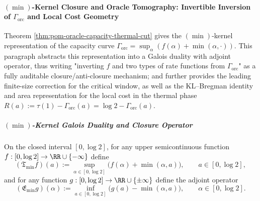 \paragraph{\texorpdfstring{$(\min)$}{min}-Kernel Closure and Oracle Tomography: Invertible Inversion of \texorpdfstring{$\Gamma_{\mathrm{orc}}$}{Gamma\_orc} and Local Cost Geometry}
Theorem \ref{thm:pom-oracle-capacity-thermal-cut} gives the \((\min)\)-kernel representation of the capacity curve
\(
\Gamma_{\mathrm{orc}}=\sup_{\alpha}(f(\alpha)+\min(\alpha,\cdot))
\).
This paragraph abstracts this representation into a Galois duality with adjoint operator, thus writing "inverting \(f\) and two types of rate functions from \(\Gamma_{\mathrm{orc}}\)" as a fully auditable closure/anti-closure mechanism;
and further provides the leading finite-size correction for the critical window, as well as the KL--Bregman identity and area representation for the local cost in the thermal phase
\(
R(a):=\tau(1)-\Gamma_{\mathrm{orc}}(a)=\log 2-\Gamma_{\mathrm{orc}}(a)
\).

\subparagraph{\texorpdfstring{$(\min)$}{min}-Kernel Galois Duality and Closure Operator}
On the closed interval \([0,\log 2]\), for any upper semicontinuous function \(f:[0,\log 2]\to\RR\cup\{-\infty\}\) define
\begin{equation}\label{eq:pom-min-kernel-closure-operator-T}
(\mathfrak{T}_{\min} f)(a)
:=\sup_{\alpha\in[0,\log 2]}\bigl(f(\alpha)+\min(\alpha,a)\bigr),
\qquad a\in[0,\log 2],
\end{equation}
and for any function \(g:[0,\log 2]\to\RR\cup\{\pm\infty\}\) define the adjoint operator
\begin{equation}\label{eq:pom-min-kernel-erosion-operator-E}
(\mathfrak{E}_{\min} g)(\alpha)
:=\inf_{a\in[0,\log 2]}\bigl(g(a)-\min(\alpha,a)\bigr),
\qquad \alpha\in[0,\log 2].
\end{equation}

